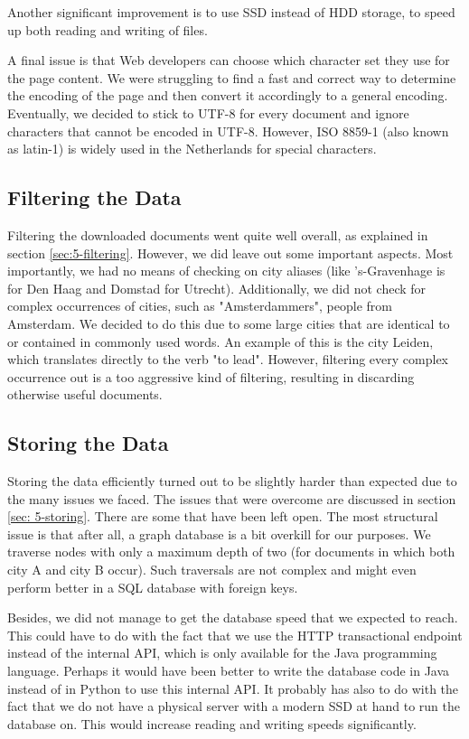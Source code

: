 Another significant improvement is to use SSD instead of HDD storage, to speed up both reading and writing of files.

A final issue is that Web developers can choose which character set they use for the page content. We were struggling to find a fast and correct way to determine the encoding of the page and then convert it accordingly to a general encoding. Eventually, we decided to stick to UTF-8 for every document and ignore characters that cannot be encoded in UTF-8. However, ISO 8859-1 (also known as latin-1) is widely used in the Netherlands for special characters.

\subsection{Filtering the Data}
Filtering the downloaded documents went quite well overall, as explained in section \ref{sec:5-filtering}. However, we did leave out some important aspects. Most importantly, we had no means of checking on city aliases (like 's-Gravenhage is for Den Haag and Domstad for Utrecht). Additionally, we did not check for complex occurrences of cities, such as "Amsterdammers", people from Amsterdam. We decided to do this due to some large cities that are identical to or contained in commonly used words. An example of this is the city Leiden, which translates directly to the verb "to lead". However, filtering every complex occurrence out is a too aggressive kind of filtering, resulting in discarding otherwise useful documents.

\subsection{Storing the Data}
Storing the data efficiently turned out to be slightly harder than expected due to the many issues we faced. The issues that were overcome are discussed in section \ref{sec: 5-storing}. There are some that have been left open. The most structural issue is that after all, a graph database is a bit overkill for our purposes. We traverse nodes with only a maximum depth of two (for documents in which both city A and city B occur). Such traversals are not complex and might even perform better in a SQL database with foreign keys.

Besides, we did not manage to get the database speed that we expected to reach. This could have to do with the fact that we use the HTTP transactional endpoint instead of the internal API, which is only available for the Java programming language. Perhaps it would have been better to write the database code in Java instead of in Python to use this internal API. It probably has also to do with the fact that we do not have a physical server with a modern SSD at hand to run the database on. This would increase reading and writing speeds significantly.

